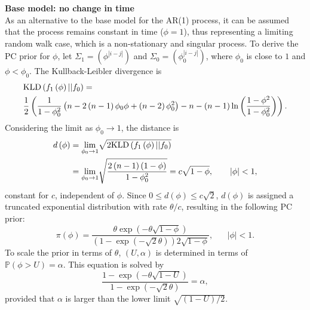 \documentclass[12pt]{book}
\begin{document}
\textbf{Base model: no change in time} \vspace{6pt}\\
As an alternative to the base model for the AR(1) process, it can be assumed that the process remains constant in time ($\phi = 1$), thus representing a limiting random walk case, which is a non-stationary and singular process. To derive the PC prior for $\phi$, let $\Sigma_1=\left(\phi^{|i-j|}\right)$ and $\Sigma_0=\left(\phi_0^{|i-j|}\right)$, where $\phi_0$ is close to $1$ and $\phi<\phi_0$. The Kullback-Leibler divergence is
\begin{align*}
    &\hbox{KLD}\left(f_1\left(\phi\right)||f_0\right)=\\
    &\frac{1}{2}\left(\frac{1}{1-\phi_0^2}\left(n-2\left(n-1\right)\phi_0\phi+\left(n-2\right)\phi_0^2\right)-n-\left(n-1\right)\ln\left(\frac{1-\phi^2}{1-\phi_0^2}\right)\right).
\end{align*}
Considering the limit as $\phi_0\rightarrow1$, the distance is
\begin{align*}
    d\left(\phi\right)&=\underset{\phi_0\rightarrow1}{\lim}\sqrt{2\hbox{KLD}\left(f_1\left(\phi\right)||f_0\right)} \\
    &=\underset{\phi_0\rightarrow1}{\lim}\sqrt{\frac{2\left(n-1\right)\left(1-\phi\right)}{1-\phi_0^2}} = c\sqrt{1-\phi}, \hspace{20pt}|\phi|<1,
\end{align*}
constant for $c$, independent of $\phi$. Since $0\leq d\left(\phi\right)\leq c\sqrt{2}$, $d\left(\phi\right)$ is assigned a truncated exponential distribution with rate $\theta/c$, resulting in the following PC prior:
\begin{equation}
    \pi\left(\phi\right)=\frac{\theta\exp\left(-\theta\sqrt{1-\phi}\right)}{\left(1-\exp\left(-\sqrt{2}\theta\right)\right)2\sqrt{1-\phi}}, \hspace{20pt}|\phi|<1.
\end{equation}
To scale the prior in terms of $\theta$, $\left(U,\alpha\right)$ is determined in terms of $\mathbb{P}\left(\phi>U\right)=\alpha$. This equation is solved by
\begin{equation*}
    \frac{1-\exp\left(-\theta\sqrt{1-U}\right)}{1-\exp\left(-\sqrt{2}\theta\right)}=\alpha,
\end{equation*}
provided that $\alpha$ is larger than the lower limit $\sqrt{\left(1-U\right)/2}$. \autocite[Cf.][]{sorbye2017penalised}
\end{document}
